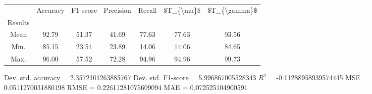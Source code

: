 \begin{tabular}{|c|c|c|c|c|c|c|}
\toprule
{} &  Accuracy &  F1 score &  Precision &  Recall &  \$T\_\{\textbackslash mu\}\$ &  \$T\_\{\textbackslash gamma\}\$ \\
Results &           &           &            &         &            &               \\
\hline
Mean    &     92.79 &     51.37 &      41.69 &   77.63 &      77.63 &         93.56 \\
Min.    &     85.15 &     23.54 &      23.89 &   14.06 &      14.06 &         84.65 \\
Max.    &     96.00 &     57.52 &      72.28 &   94.96 &      94.96 &         99.73 \\
\bottomrule
\end{tabular}

 Dev. std. accuracy = 2.3572101263885767
 Dev. std. F1-score = 5.996867005528343
 $R^2$ = -0.11288958939574445
 MSE = 0.0511270031880198
 RMSE = 0.22611281075609094
 MAE = 0.072525104900591